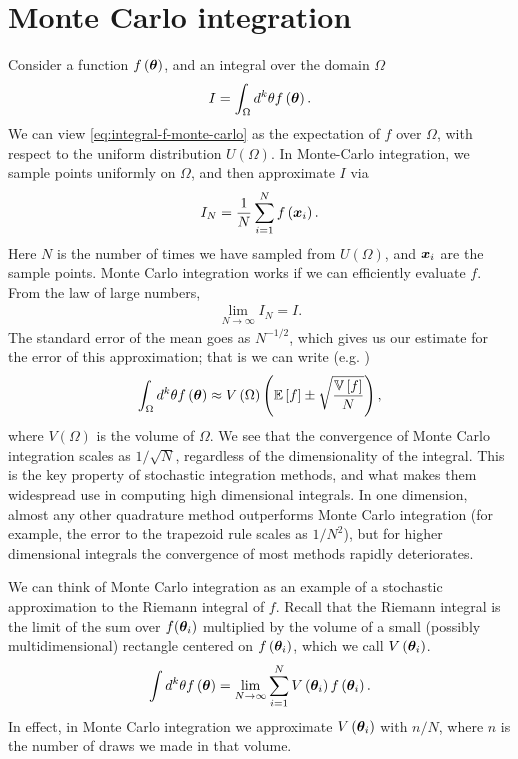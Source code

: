 \section{Monte Carlo integration\label{eq:Monte-Carlo-integration}}

Consider a function $f\left({\bm \theta}\right)$, and an integral over the domain $\Omega$
\begin{align}
    \label{eq:integral-f-monte-carlo}
    I
    =
    \int_{\Omega} d^k\theta f\left({\bm \theta}\right)
    .
\end{align}
We can view \eqref{eq:integral-f-monte-carlo} as the expectation of $f$ 
over $\Omega$, with respect to the uniform distribution $U\left(\Omega\right)$.
In Monte-Carlo integration, we sample points uniformly on $\Omega$, and then
approximate $I$ via
\begin{align}
    \label{eq:monte-carlo-integral-f}
    I_N
    = 
    \frac{1}{N}\sum_{i=1}^N f\left({\bm x}_i\right)
    .
\end{align}
Here $N$ is the number of times we have sampled from $U\left(\Omega\right)$,
and ${\bm x}_i$ are the sample points.
Monte Carlo integration works if we can efficiently evaluate $f$. 
From the law of large numbers,
\begin{align}
    \lim_{N\to\infty}I_N = I
    .
\end{align}
The standard error of the mean goes as $N^{-1/2}$, which gives us our estimate
for the error of this approximation; that is we can write (e.g. \cite{PresTeukVettFlan92})
\begin{align}
    \int_{\Omega} d^k\theta f\left({\bm \theta}\right)
    \approx
    V\left(\Omega\right)
    \left(
        \mathbb{E}\left[f\right]
        \pm
        \sqrt{\frac{\mathbb{V}\left[f\right]}{N}}
    \right)
    ,
\end{align}
where $V\left(\Omega\right)$ is the volume of $\Omega$.
We see that the convergence of Monte Carlo integration scales as $1/\sqrt{N}$,
regardless of the dimensionality of the integral.
This is the key property of stochastic integration methods, and what makes them
widespread use in computing high dimensional integrals.
In one dimension, almost any other quadrature method outperforms Monte Carlo integration 
(for example, the error to the trapezoid rule scales as $1/N^2$),
but for higher dimensional integrals the convergence of most methods rapidly deteriorates.

We can think of Monte Carlo integration as an example of a stochastic approximation
to the Riemann integral of $f$.
Recall that the Riemann integral is the limit of the sum over $f({\bm \theta}_i)$
multiplied by the volume of a small (possibly multidimensional) 
rectangle centered on $f\left({\bm \theta}_i\right)$,
which we call $V\left({\bm \theta}_i\right)$.
\begin{align}
    \int d^k\theta f\left({\bm \theta}\right)
    =
    \lim_{N\to\infty}\sum_{i=1}^N V\left({\bm \theta}_i\right)f\left({\bm \theta}_i\right)
    .
\end{align}
In effect, in Monte Carlo integration we approximate $V\left({\bm \theta}_i\right)$
with $n/N$, where $n$ is the number of draws we made in that volume.

